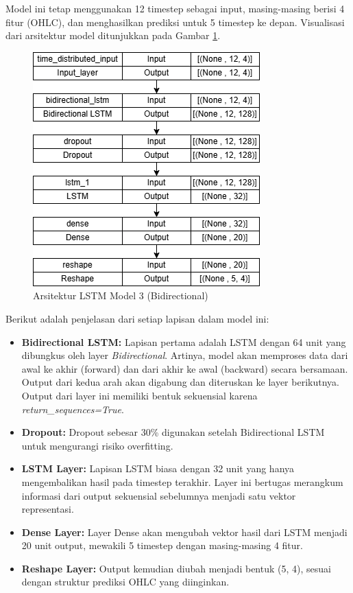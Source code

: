 Model ini tetap menggunakan 12 timestep sebagai input, masing-masing berisi 4 fitur (OHLC), dan menghasilkan prediksi untuk 5 timestep ke depan. Visualisasi dari arsitektur model ditunjukkan pada Gambar \ref{fig:lstm3}.

\begin{figure} [H] \centering
    \includegraphics[scale=0.8]{gambar/lstmmodel3.png} 
    \caption{Arsitektur LSTM Model 3 (Bidirectional)}
    \label{fig:lstm3}
\end{figure}

Berikut adalah penjelasan dari setiap lapisan dalam model ini:

\begin{itemize}
    \item \textbf{Bidirectional LSTM:} Lapisan pertama adalah LSTM dengan 64 unit yang dibungkus oleh layer \textit{Bidirectional}. Artinya, model akan memproses data dari awal ke akhir (forward) dan dari akhir ke awal (backward) secara bersamaan. Output dari kedua arah akan digabung dan diteruskan ke layer berikutnya. Output dari layer ini memiliki bentuk sekuensial karena \textit{return\_sequences=True}.
    
    \item \textbf{Dropout:} Dropout sebesar 30\% digunakan setelah Bidirectional LSTM untuk mengurangi risiko overfitting.
    
    \item \textbf{LSTM Layer:} Lapisan LSTM biasa dengan 32 unit yang hanya mengembalikan hasil pada timestep terakhir. Layer ini bertugas merangkum informasi dari output sekuensial sebelumnya menjadi satu vektor representasi.
    
    \item \textbf{Dense Layer:} Layer Dense akan mengubah vektor hasil dari LSTM menjadi 20 unit output, mewakili 5 timestep dengan masing-masing 4 fitur.
    
    \item \textbf{Reshape Layer:} Output kemudian diubah menjadi bentuk (5, 4), sesuai dengan struktur prediksi OHLC yang diinginkan.
\end{itemize}

